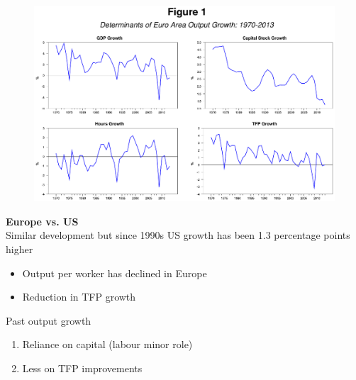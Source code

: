 \documentclass{beamer}
\begin{document}
\begin{frame}
  \begin{figure}
    \includegraphics[scale=.7]{growth_accounting2.eps}
  \end{figure}
\end{frame}

\begin{frame}
  \textbf{Europe vs. US}\\
  Similar development but since 1990s US growth has been 1.3 percentage points higher
  \begin{itemize}
    \item Output per worker has declined in Europe
    \item Reduction in TFP growth
  \end{itemize}
  \medskip
  Past output growth 
  \begin{enumerate}
    \item Reliance on capital (labour minor role)
    \item Less on TFP improvements 
  \end{enumerate}  
\end{frame}
\end{document}
